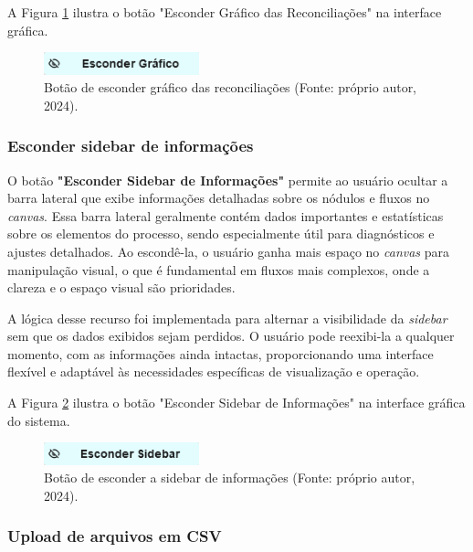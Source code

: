 A Figura \ref{Fig:HideGraphButton} ilustra o botão "Esconder Gráfico das Reconciliações" na interface gráfica.

\begin{figure}[htbp]
    \centering
    \includegraphics[width=0.4\textwidth]{figuras/hide-graphbar-button.png}
    \caption{Botão de esconder gráfico das reconciliações (Fonte: próprio autor, 2024).}
    \label{Fig:HideGraphButton}
\end{figure}

\subsubsection{Esconder sidebar de informações}

O botão \textbf{"Esconder Sidebar de Informações"} permite ao usuário ocultar a barra lateral que exibe informações detalhadas sobre os nódulos e fluxos no \textit{canvas}. Essa barra lateral geralmente contém dados importantes e estatísticas sobre os elementos do processo, sendo especialmente útil para diagnósticos e ajustes detalhados. Ao escondê-la, o usuário ganha mais espaço no \textit{canvas} para manipulação visual, o que é fundamental em fluxos mais complexos, onde a clareza e o espaço visual são prioridades.

A lógica desse recurso foi implementada para alternar a visibilidade da \textit{sidebar} sem que os dados exibidos sejam perdidos. O usuário pode reexibi-la a qualquer momento, com as informações ainda intactas, proporcionando uma interface flexível e adaptável às necessidades específicas de visualização e operação.

A Figura \ref{Fig:HideSidebarButton} ilustra o botão "Esconder Sidebar de Informações" na interface gráfica do sistema.

\begin{figure}[htbp]
    \centering
    \includegraphics[width=0.4\textwidth]{figuras/hide-sidebar-button.png}
    \caption{Botão de esconder a sidebar de informações (Fonte: próprio autor, 2024).}
    \label{Fig:HideSidebarButton}
\end{figure}

\subsubsection{Upload de arquivos em CSV}

